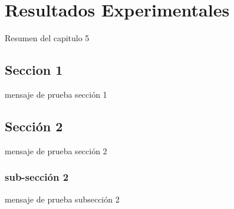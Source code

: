 \chapter{Resultados Experimentales}
\label{capitulo5}

Resumen del capitulo 5

\section{Seccion 1}
mensaje de prueba sección 1

\section{Sección 2}
mensaje de prueba sección 2
\subsection{sub-sección 2}
mensaje de prueba subsección 2